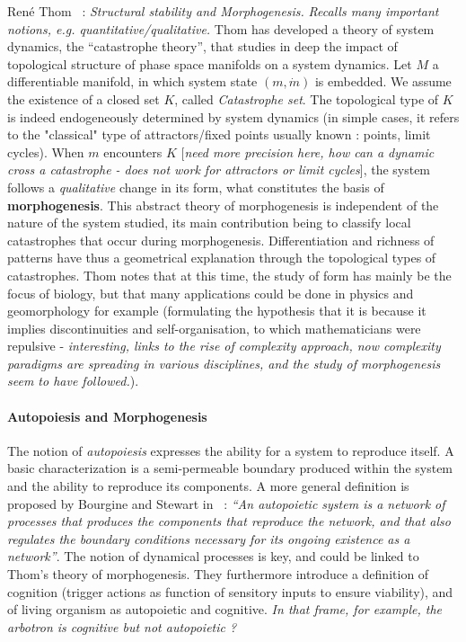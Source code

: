 \documentclass[fleqn,10pt]{wlscirep}
\begin{document}
Ren{\'e} Thom~\cite{thom1974stabilite} : \textit{Structural stability and Morphogenesis.} \textit{Recalls many important notions, e.g. quantitative/qualitative.} Thom has developed a theory of system dynamics, the ``catastrophe theory'', that studies in deep the impact of topological structure of phase space manifolds on a system dynamics. Let $M$ a differentiable manifold, in which system state $(m,\dot{m})$ is embedded. We assume the existence of a closed set $K$, called \emph{Catastrophe set}. The topological type of $K$ is indeed endogeneously determined by system dynamics (in simple cases, it refers to the "classical" type of attractors/fixed points usually known : points, limit cycles). When $m$ encounters $K$ [\textit{need more precision here, how can a dynamic cross a catastrophe - does not work for attractors or limit cycles}], the system follows a \emph{qualitative} change in its form, what constitutes the basis of \textbf{morphogenesis}. This abstract theory of morphogenesis is independent of the nature of the system studied, its main contribution being to classify local catastrophes that occur during morphogenesis. Differentiation and richness of patterns have thus a geometrical explanation through the topological types of catastrophes. Thom notes that at this time, the study of form has mainly be the focus of biology, but that many applications could be done in physics and geomorphology for example (formulating the hypothesis that it is because it implies discontinuities and self-organisation, to which mathematicians were repulsive - \textit{interesting, links to the rise of complexity approach, now complexity paradigms are spreading in various disciplines, and the study of morphogenesis seem to have followed.}).


\paragraph{Autopoiesis and Morphogenesis}

The notion of \emph{autopoiesis} expresses the ability for a system to reproduce itself. A basic characterization is a semi-permeable boundary produced within the system and the ability to reproduce its components. A more general definition is proposed by Bourgine and Stewart in~\cite{bourgine2004autopoiesis} : \textit{``An autopoietic system is a network of processes that produces the components that reproduce the network, and that also regulates the boundary conditions necessary for its ongoing existence as a network''}. The notion of dynamical processes is key, and could be linked to Thom's theory of morphogenesis. They furthermore introduce a definition of cognition (trigger actions as function of sensitory inputs to ensure viability), and of living organism as autopoietic and cognitive. \textit{In that frame, for example, the arbotron is cognitive but not autopoietic ?}
\end{document}
